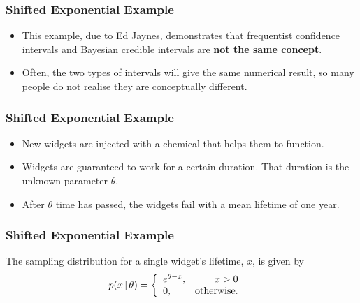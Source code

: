 \documentclass{beamer}
\newcommand{\given}{\,|\,}
\begin{document}
\begin{frame}[fragile]
\frametitle{Shifted Exponential Example}
\begin{itemize}
\item This example, due to Ed Jaynes, demonstrates that frequentist confidence intervals
and Bayesian credible intervals are {\bf not the same concept}.\pause
\item Often, the two types of intervals will give the same numerical result, so
many people do not realise they are conceptually different.
\end{itemize}

\end{frame}

\begin{frame}[fragile]
\frametitle{Shifted Exponential Example}
\begin{itemize}
\item New widgets are injected with a chemical that helps
them to function.\pause
\item Widgets are guaranteed to work for a certain duration. That duration is the
unknown parameter $\theta$.\pause
\item After $\theta$ time has passed, the widgets fail with a mean lifetime
of one year.
\end{itemize}

\end{frame}


\begin{frame}[fragile]
\frametitle{Shifted Exponential Example}
The sampling distribution for a single widget's lifetime, $x$, is given by
\begin{align}
p(x \given \theta) &= \left\{
    \begin{array}{lr}
    e^{\theta - x}, & x > 0 \\
    0,              & \textnormal{otherwise.}
    \end{array}
    \right.
\end{align}

\end{frame}
\end{document}
